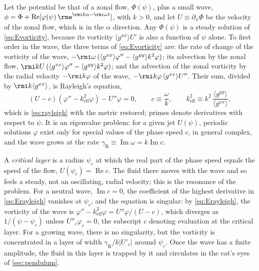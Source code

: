 Let the potential be that of a zonal flow, \(\Phi(\psi)\), plus a small wave, \(\phi = \Phi + \operatorname{Re}[\varphi(\psi)\,\rme^{\rmi k\alpha - \rmi\omega t}]\), with \(k > 0\), and let \(U\equiv\partial_\psi\Phi\) be the velocity of the zonal flow, which is in the \(\alpha\) direction. Any \(\Phi(\psi)\) is a steady solution of \cref{eq:Evorticity}, because its vorticity \(\langle g^{xx}\rangle U'\) is also a function of \(\psi\) alone. To first order in the wave, the three terms of \cref{eq:Evorticity} are: the rate of change of the vorticity of the wave, \(-\rmi\omega\,(\langle g^{xx}\rangle\varphi'' - \langle g^{yy}\rangle k^2\varphi)\); its advection by the zonal flow, \(\rmi kU\,(\langle g^{xx}\rangle\varphi'' - \langle g^{yy}\rangle k^2\varphi)\); and the advection of the zonal vorticity by the radial velocity \(-\rmi k\varphi\) of the wave, \(-\rmi k\varphi\,\langle g^{xx}\rangle U''\). Their sum, divided by \(\rmi k\langle g^{xx}\rangle\), is Rayleigh's equation,
\begin{equation}
\left(U - c\right)\left(\varphi'' - k_\text{eff}^2\varphi\right) - U''\varphi = 0,
\qquad
c\equiv\frac{\omega}{k},
\qquad
k_\text{eff}^2\equiv k^2\,\frac{\langle g^{yy}\rangle}{\langle g^{xx}\rangle},
\label{eq:Erayleigh}
\end{equation}
which is \cref{eq:rayleigh} with the metric restored; primes denote derivatives with respect to \(\psi\). It is an eigenvalue problem: for a given jet \(U(\psi)\), periodic solutions \(\varphi\) exist only for special values of the phase speed \(c\), in general complex, and the wave grows at the rate \(\gamma_\text{R}\equiv\operatorname{Im}\omega = k\operatorname{Im}c\).

A \textit{critical layer} is a radius \(\psi_c\) at which the real part of the phase speed equals the speed of the flow, \(U(\psi_c) = \operatorname{Re}c\). The fluid there moves with the wave and so feels a steady, not an oscillating, radial velocity; this is the resonance of the problem. For a neutral wave, \(\operatorname{Im}c = 0\), the coefficient of the highest derivative in \cref{eq:Erayleigh} vanishes at \(\psi_c\), and the equation is singular: by \cref{eq:Erayleigh}, the vorticity of the wave is \(\varphi'' - k_\text{eff}^2\varphi = U''\varphi/(U - c)\), which diverges as \(1/(\psi - \psi_c)\) unless \(U''_c\varphi_c = 0\), the subscript \(c\) denoting evaluation at the critical layer. For a growing wave, there is no singularity, but the vorticity is concentrated in a layer of width \(\gamma_\text{R}/k|U'_c|\) around \(\psi_c\). Once the wave has a finite amplitude, the fluid in this layer is trapped by it and circulates in the cat's eyes of \cref{sec:pendulum}.

